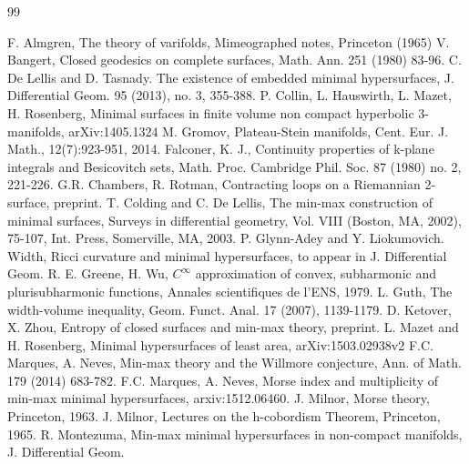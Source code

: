 \documentclass[12pt]{amsart}
\theoremstyle{definition}
\begin{document}
\begin{thebibliography}{99}
%

\small

 F. Almgren, The theory of varifolds, Mimeographed notes, Princeton (1965)
 V. Bangert, Closed geodesics on complete surfaces, Math. Ann. 251 (1980) 83-96.
 C. De Lellis and D. Tasnady. The existence of embedded minimal hypersurfaces,
J. Differential Geom. 95 (2013), no. 3, 355-388.
 P. Collin, L. Hauswirth,
L. Mazet, H. Rosenberg, Minimal surfaces in finite volume non compact hyperbolic 3-manifolds, arXiv:1405.1324
  M. Gromov, Plateau-Stein manifolds, Cent. Eur. J. Math., 12(7):923-951, 2014.
  Falconer, K. J., Continuity properties of k-plane integrals and Besicovitch sets, Math. Proc.
Cambridge Phil. Soc. 87 (1980) no. 2, 221-226.
 G.R. Chambers, R. Rotman, Contracting loops on a Riemannian 2-surface, preprint.
  T. Colding and C. De Lellis, The min-max construction of minimal surfaces, Surveys in differential
geometry, Vol. VIII (Boston, MA, 2002), 75-107, Int. Press, Somerville, MA, 2003.
  P. Glynn-Adey and Y. Liokumovich. Width, Ricci curvature and minimal hypersurfaces, 
to appear in  J. Differential Geom.
 R. E. Greene, H. Wu, $C^\infty$ approximation of convex, subharmonic and plurisubharmonic functions, Annales scientifiques de l'ENS, 1979.
 L. Guth, The width-volume inequality, Geom. Funct. Anal. 17 (2007), 1139-1179.
 D. Ketover, X. Zhou, Entropy of closed surfaces and min-max theory, preprint.
 L. Mazet and H. Rosenberg, Minimal hypersurfaces of least area, arXiv:1503.02938v2
 F.C. Marques, A. Neves, Min-max theory and the Willmore conjecture, Ann. of Math. 179 (2014) 683-782.
 F.C. Marques, A. Neves, Morse index and multiplicity of min-max minimal hypersurfaces,
arxiv:1512.06460.
 J. Milnor, Morse theory, Princeton, 1963.
 J. Milnor, Lectures on the h-cobordism Theorem, Princeton, 1965.
 R. Montezuma, Min-max minimal hypersurfaces in non-compact manifolds, J. Differential Geom.

\end{thebibliography}
\end{document}
